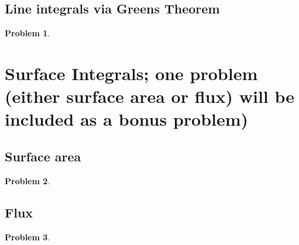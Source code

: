 \documentclass{article}
\newtheorem{problem}{Problem}
\begin{document}
\subsection{Line integrals via Greens Theorem}
\begin{problem}

\end{problem}
\section{Surface Integrals; one problem (either surface area or flux) will be included as a bonus problem)}
\subsection{Surface area}
\begin{problem}

\end{problem}
\subsection{Flux}
\begin{problem}

\end{problem}
\end{document}
